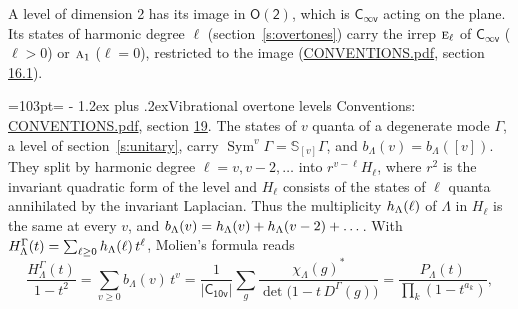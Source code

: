 \documentclass[10pt,a4paper]{article}
\makeatletter
\renewcommand\section{\@startsection{section}{1}{\z@}{-3ex plus -1ex minus -.2ex}%
  {1.2ex plus .2ex}{\normalfont\large\sffamily\bfseries\color{parttitle}}}
\newcommand{\needspace}[1]{\par\penalty-100\begingroup\dimen0=#1\relax\dimen2=\pagegoal
  \advance\dimen2-\pagetotal\ifdim\dimen0>\dimen2\relax\ifdim\dimen2>0pt\vfil\break\fi\fi
  \endgroup}
\numberwithin{equation}{section}
\newcommand{\grp}[1]{\mathsf{#1}}
\newcommand{\irr}[1]{\text{\normalfont\scshape #1}}
\newcommand{\repD}[1]{D^{#1}}
\newcommand{\irchar}[1]{\chi_{#1}}
\newcommand{\conj}[1]{{#1}^{*}}
\newcommand{\schur}[1]{\mathbb{S}_{#1}}
\newcommand{\shape}[1]{[#1]}
\makeatother
\begin{document}
A level of dimension 2 has its image in $\grp{O(2)}$, which is \href{Cinfv.pdf}{$\grp{C_{\infty v}}$} acting on the plane. \label{n:index.harmonic.degree}Its states of harmonic degree $\ell$ (section~\ref{s:overtones}) carry the irrep $\irr{e}_{\ell}$ of \href{Cinfv.pdf}{$\grp{C_{\infty v}}$} ($\ell > 0$) or $\irr{a}_{1}$ ($\ell = 0$), restricted to the image (\href{../../CONVENTIONS.pdf}{CONVENTIONS.pdf}, section \href{../../CONVENTIONS.pdf\#conv.16.1}{16.1}).
\needspace{103pt}
\section{Vibrational overtone levels}\label{s:overtones}
Conventions: \href{../../CONVENTIONS.pdf}{CONVENTIONS.pdf}, section \href{../../CONVENTIONS.pdf\#conv.19}{19}.
\leavevmode\label{n:index.quanta}\label{n:operator.symmetric.power}The states of $v$ quanta of a degenerate mode $\Gamma$, a level of section~\ref{s:unitary}, carry $\operatorname{Sym}^{v}\Gamma = \schur{\shape{v}}\Gamma$, and $b_\Lambda(v) = b_\Lambda(\shape{v})$. \label{n:local.quadratic.form}\label{n:set.harmonic}They split by harmonic degree $\ell = v, v - 2, \dots$ into $r^{v-\ell}H_\ell$, where $r^2$ is the invariant quadratic form of the level and $H_\ell$ consists of the states of $\ell$ quanta annihilated by the invariant Laplacian. \label{n:function.multiplicity.harmonic}Thus the multiplicity $\mathnormal{h}_\Lambda(\ell)$ of $\Lambda$ in $H_\ell$ is the same at every $v$, and $b_\Lambda(v) = \mathnormal{h}_\Lambda(v) + \mathnormal{h}_\Lambda(v - 2) + \dots$. \label{n:function.generating.level}With $H^{\Gamma}_\Lambda(t) = \sum_{\ell\ge0} \mathnormal{h}_\Lambda(\ell)\,t^{\ell}$, Molien's formula reads
\begin{equation}\label{e:molien}\frac{H^{\Gamma}_\Lambda(t)}{1 - t^2} = \sum_{v\ge0} b_\Lambda(v)\,t^v = \frac{1}{|\grp{C_{10v}}|}\sum_{g}\frac{\conj{\irchar{\Lambda}(g)}}{\det\bigl(1 - t\,\repD{\Gamma}(g)\bigr)} = \frac{P_\Lambda(t)}{\prod_k (1-t^{a_k})},\end{equation}
\end{document}

